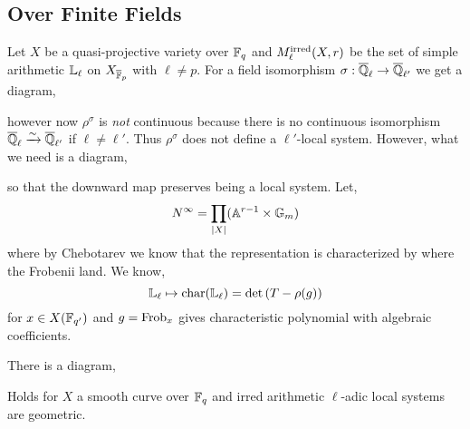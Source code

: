 \documentclass[12pt]{article}
\begin{document}
\subsection{Over Finite Fields}

Let $X$ be a quasi-projective variety over $\mathbb{F}_q$ and $M^{\mathrm{irred}}_\ell(X,r)$ be the set of simple arithmetic $\mathbb{L}_{\ell}$ on $X_{\overline{\mathbb{F}}_p}$ with $\ell \neq p$. For a field isomorphism $\sigma : \overline{\mathbb{Q}}_{\ell} \to \overline{\mathbb{Q}}_{\ell'}$ we get a diagram,
\begin{center}
\end{center}
however now $\rho^{\sigma}$ is \textit{not} continuous because there is no continuous isomorphism $\overline{\mathbb{Q}}_{\ell} \xrightarrow{\sim} \overline{\mathbb{Q}}_{\ell'}$ if $\ell \neq \ell'$. Thus $\rho^{\sigma}$ does not define a $\ell'$-local system. However, what we need is a diagram,
\begin{center}
\end{center}
so that the downward map preserves being a local system. 
Let,
\[ N^\infty = \prod_{|X|} (\mathbb{A}^{r-1} \times \mathbb{G}_m) \]
where by Chebotarev we know that the representation is characterized by where the Frobenii land. We know,
\[ \mathbb{L}_{\ell} \mapsto \mathrm{char}(\mathbb{L}_\ell) = \det{(T - \rho(g))} \]
for $x \in X(\mathbb{F}_{q'})$ and $g = \mathrm{Frob}_x$ gives characteristic polynomial with algebraic coefficients.

\begin{conj}
There is a diagram,
\begin{center}
\end{center}
\end{conj}

\begin{theorem}[Lafforge]
Holds for $X$ a smooth curve over $\mathbb{F}_q$ and irred arithmetic $\ell$-adic local systems are geometric.
\end{theorem}
\end{document}
